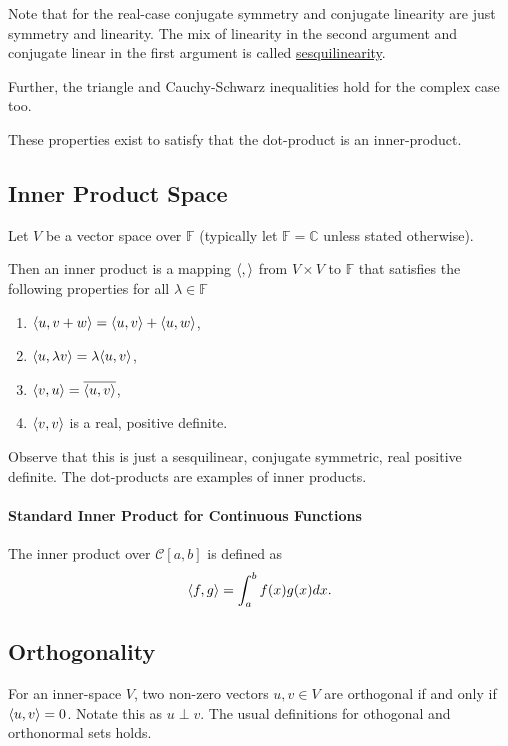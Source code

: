 Note that for the real-case conjugate symmetry and conjugate linearity
are just symmetry and linearity. The mix of linearity in the second argument
and conjugate linear in the first argument is called \underline{sesquilinearity}.

Further, the triangle and Cauchy-Schwarz inequalities hold for the complex
case too.

These properties exist to satisfy that the dot-product is an inner-product.

%
%
%
\subsection{Inner Product Space}
Let \( V \) be a vector space over \( \mathbb{F} \)
(typically let \( \mathbb{F} = \mathbb{C} \) unless stated otherwise).

Then an inner product is a mapping \( \langle ,  \rangle \) from \( V \times V \)
to \( \mathbb{F} \) that satisfies the following properties for all \( \lambda \in \mathbb{F} \)
\begin{enumerate}
    \item \( \langle u, v + w \rangle = \langle u, v \rangle + \langle u, w \rangle \),
    \item \( \langle u, \lambda v \rangle = \lambda \langle u, v \rangle\),
    \item \( \langle v, u \rangle = \overline{\langle u, v \rangle} \),
    \item \( \langle v, v \rangle \) is a real, positive definite.
\end{enumerate}

Observe that this is just a sesquilinear, conjugate symmetric, real positive definite.
The dot-products are examples of inner products.

\paragraph{Standard Inner Product for Continuous Functions}
The inner product over \( \mathcal{C}[a, b] \) is defined as \[
    \langle f, g \rangle = \int_a^b f(x) g(x) dx.
\]

%
%
%
\subsection{Orthogonality}
For an inner-space \( V \), two non-zero vectors \( u, v \in V \) are orthogonal if
and only if \( \langle u, v \rangle = 0 \).
Notate this as \( u \perp v \).
The usual definitions for othogonal and orthonormal sets holds.


